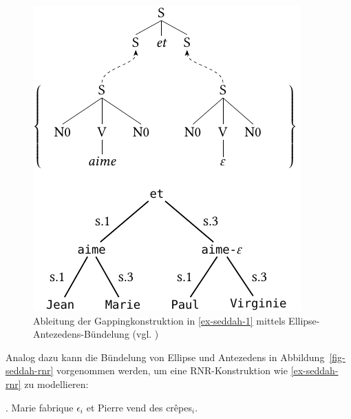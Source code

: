 \begin{figure}[t]
\centering
\includegraphics{graphics/abb811.pdf}
\caption{\label{fig-seddah-1}Ableitung der Gappingkonstruktion in \ref{ex-seddah-1} mittels Ellipse-Antezedens-Bündelung (vgl. \citealt[Figure~1]{Seddah:etal:10})}
\end {figure}


Analog dazu kann die Bündelung von Ellipse und Antezedens in Abbildung~\ref{fig-seddah-rnr} vorgenommen werden, um eine RNR-Konstruktion wie \ref{ex-seddah-rnr} zu modellieren:  

\ex. \label{ex-seddah-rnr}  Marie fabrique $\epsilon_i$ et Pierre vend des cr\^{e}pes$_i$. \hfill \citep[(2)]{Seddah:etal:10}

